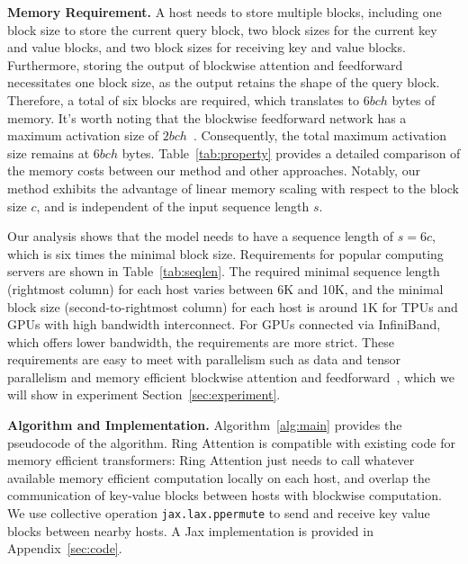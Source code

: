 \textbf{Memory Requirement.} A host needs to store multiple blocks, including one block size to store the current query block, two block sizes for the current key and value blocks, and two block sizes for receiving key and value blocks. Furthermore, storing the output of blockwise attention and feedforward necessitates one block size, as the output retains the shape of the query block. Therefore, a total of six blocks are required, which translates to $6bch$ bytes of memory. It's worth noting that the blockwise feedforward network has a maximum activation size of $2bch$~\citep{liu2023blockwise}. Consequently, the total maximum activation size remains at $6bch$ bytes.
Table~\ref{tab:property} provides a detailed comparison of the memory costs between our method and other approaches. Notably, our method exhibits the advantage of linear memory scaling with respect to the block size $c$, and is independent of the input sequence length $s$.

Our analysis shows that the model needs to have a sequence length of $s=6c$, which is six times the minimal block size. Requirements for popular computing servers are shown in Table~\ref{tab:seqlen}. The required minimal sequence length (rightmost column) for each host varies between 6K and 10K, and the minimal block size (second-to-rightmost column) for each host is around 1K for TPUs and GPUs with high bandwidth interconnect. For GPUs connected via InfiniBand, which offers lower bandwidth, the requirements are more strict. These requirements are easy to meet with parallelism such as data and tensor parallelism and memory efficient blockwise attention and feedforward~\citep{rabe2021self,dao2022flashattention,liu2023blockwise}, which we will show in experiment Section~\ref{sec:experiment}.

\textbf{Algorithm and Implementation.}
Algorithm~\ref{alg:main} provides the pseudocode of the algorithm. {Ring Attention} is compatible with existing code for memory efficient transformers: {Ring Attention} just needs to call whatever available memory efficient computation locally on each host, and overlap the communication of key-value blocks between hosts with blockwise computation. We use collective operation \texttt{jax.lax.ppermute} to send and receive key value blocks between nearby hosts. A Jax implementation is provided in Appendix~\ref{sec:code}.


